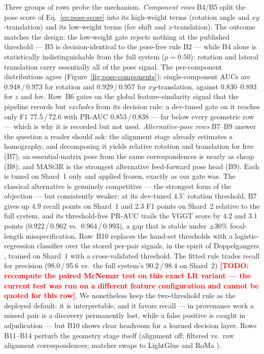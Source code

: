 \documentclass[letterpaper]{article} %
\newcommand{\todo}[1]{\textcolor{red}{\textbf{[TODO: #1]}}}
\begin{document}
Three groups of rows probe the mechanism. \emph{Component rows} B4/B5
split the pose score of Eq.~\ref{eq:pose-score} into its high-weight terms
(rotation angle and $xy$-translation) and its low-weight terms (fov shift
and $z$-translation). The outcome matches the design: the low-weight gate
rejects nothing at the published threshold --- B5 is decision-identical
to the pose-free rule B2 --- while B4 alone is statistically
indistinguishable from the full system ($p=0.50$): rotation and lateral
translation carry essentially all of the pose signal. The per-component
distributions agree (Figure~\ref{fig:pose-components}): single-component
AUCs are 0.948\,/\,0.973 for rotation and 0.929\,/\,0.957 for
$xy$-translation, against 0.830--0.893 for $z$ and fov. Row~B6 gates on
the global feature-similarity signal that the pipeline records but
\emph{excludes} from its decision rule: a dev-tuned gate on it reaches
only F1 77.5\,/\,72.6 with PR-AUC 0.853\,/\,0.838 --- far below every
geometric row --- which is why it is recorded but not used.
\emph{Alternative-pose rows} B7--B9 answer the question a reader should
ask: the alignment stage already estimates a homography, and decomposing
it yields relative rotation and translation for free
\cite{malis2007homography} (B7); an essential-matrix pose from the same
correspondences is nearly as cheap \cite{nister2004fivepoint} (B8); and
MASt3R \cite{leroy2024mast3r} is the strongest alternative feed-forward
pose head (B9). Each is tuned on Shard~1 only and applied frozen, exactly
as our gate was. The classical alternative is genuinely competitive ---
the strongest form of the objection --- but consistently weaker: at its
dev-tuned $4.5^{\circ}$ rotation threshold, B7 gives up 4.9 recall points
on Shard~1 and 2.3 F1 points on Shard~2 relative to the full system, and
its threshold-free PR-AUC trails the VGGT score by 4.2 and 3.1 points
(0.922\,/\,0.962 vs.\ 0.964\,/\,0.993), a gap that is stable under
$\pm 30\%$ focal-length misspecification. Row~B10 replaces the hand-set
thresholds with a logistic-regression classifier over the stored per-pair
signals, in the spirit of Doppelgangers \cite{cai2023doppelgangers},
trained on Shard~1 with a cross-validated threshold. The fitted rule
trades recall for precision (98.0\,/\,95.6 vs.\ the full system's
90.2\,/\,98.4 on Shard~2) \todo{recompute the paired McNemar test on this
exact LR variant --- the current test was run on a different feature
configuration and cannot be quoted for this row}. We nonetheless keep the
two-threshold rule as the deployed default: it is interpretable, and it favors recall --- in
provenance work a missed pair is a discovery permanently lost, while a
false positive is caught in adjudication --- but B10 shows clear headroom
for a learned decision layer. Rows B11--B14 perturb the geometry stage
itself (alignment off; filtered vs.\ raw alignment correspondences;
matcher swaps to LightGlue \cite{lindenberger2023lightglue} and RoMa
\cite{edstedt2024roma}).
\end{document}
